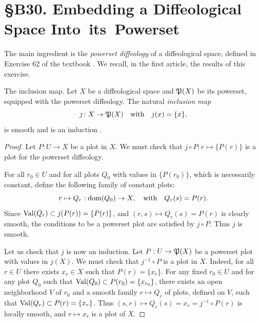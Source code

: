 
\chapter*{\S B30. Embedding a Diffeological Space \hbox{Into its Powerset}}
\setcounter{footnote}{0}


\begin{abstract}
  In this note we shall see that the natural inclusion of a diffeological space into its powerset is an embedding,
  and a closed embedding if the space is Hausdorff.
\end{abstract}


The main ingredient is the \emph{powerset diffeology} of a diffeological space,
defined in Exercise 62 of the textbook \cite{PIZ13}.
We recall,
in the first article,
the results of this exercise.

\begin{Article}{The inclusion map.}{}
  Let $X$ be a diffeological space and ${\mathfrak P}(X)$ be its powerset,
  equipped with the powerset diffeology.
  The natural \emph{inclusion map}
  $$%
    j \colon X \to \fP(X) \quad \text{with} \quad j(x) = \{x\},
  $$%
  is smooth and is an induction \cite[\textsection\,1.29]{PIZ13}.
\end{Article}

\begin{proof}
  Let $P: U \to X$ be a plot in $X$.
  We must check that $j \circ P: r \mapsto \{P(r)\}$ is a plot for the powerset diffeology.
  
  For all $r_0 \in U$ and for all plots $Q_0$ with values in $\{P(r_0)\}$,
  which is necessarily constant,
  define the following family of constant plots:
  $$%
    r \mapsto Q_r : \Domain(Q_0) \to X, \quad \text{with} \quad Q_r(s) = P(r).
  $$%
  Since $\operatorname{Val}(Q_r) \subset j(P(r)) = \{P(r)\}$,
  and $(r,s) \mapsto Q_r(s) = P(r)$ is clearly smooth,
  the conditions to be a powerset plot are satisfied by $j \circ P$.
  Thus $j$ is smooth.
  
  Let us check that $j$ is now an induction.
  Let $P: U \to {\mathfrak P}(X)$ be a powerset plot with values in $j(X)$.
  We must check that $j^{-1} \circ P$ is a plot in $X$.
  Indeed,
  for all $r \in U$ there exists $x_r \in X$ such that $P(r) = \{x_r\}$.
  For any fixed $r_0 \in U$ and for any plot $Q_0$ such that $\operatorname{Val}(Q_0) \subset P(r_0) = \{x_{r_0}\}$,
  there exists an open neighborhood $V$ of $r_0$ and a smooth family $r \mapsto Q_r$ of plots,
  defined on $V$,
  such that $\operatorname{Val}(Q_r) \subset P(r) = \{x_r\}$.
  Thus $(s,r) \mapsto Q_r(s) = x_r = j^{-1} \circ P(r)$ is locally smooth,
  and $r \mapsto x_r$ is a plot of $X$.
\end{proof}

